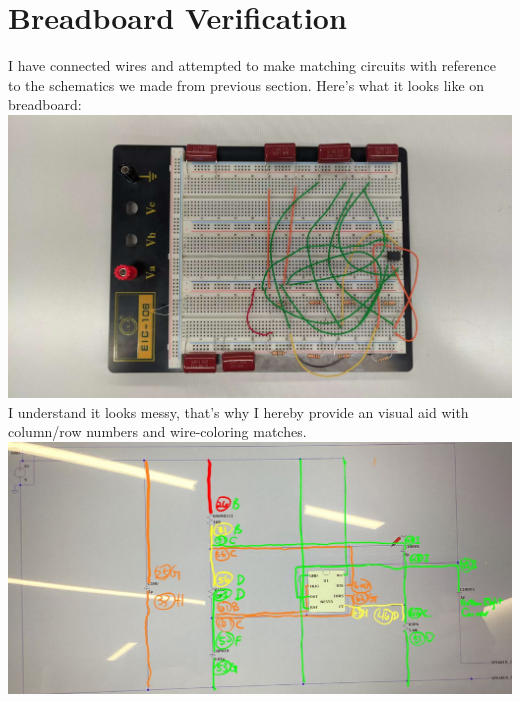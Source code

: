 \documentclass{article}
\begin{document}
	\section{Breadboard Verification}
	I have connected wires and attempted to make matching circuits with reference to the schematics we made from previous section. Here's what it looks like on breadboard:\newline
	\includegraphics[width=\columnwidth]{BREA_SCHE}
	I understand it looks messy, that's why I hereby provide an visual aid with column/row numbers and wire-coloring matches.\newline
	\includegraphics[width=\columnwidth]{LTSP_BREA_AID}
\end{document}

